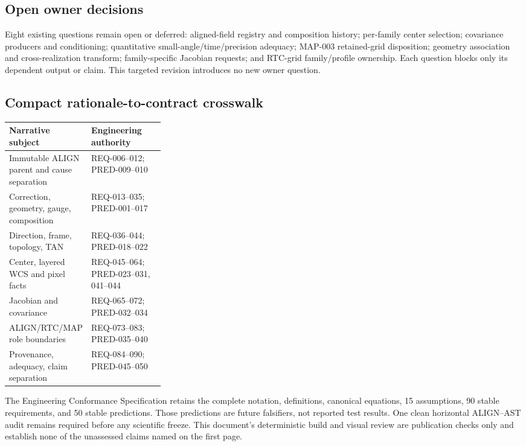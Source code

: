 \documentclass[10pt]{article}
\begin{document}
\subsection*{Open owner decisions}
Eight existing questions remain open or deferred: aligned-field registry and
composition history; per-family center selection; covariance producers and
conditioning; quantitative small-angle/time/precision adequacy; MAP-003
retained-grid disposition; geometry association and cross-realization
transform; family-specific Jacobian requests; and RTC-grid family/profile
ownership. Each question blocks only its dependent output or claim. This
targeted revision introduces no new owner question.

\subsection*{Compact rationale-to-contract crosswalk}
\begin{tabularx}{\linewidth}{>{\raggedright\arraybackslash}p{0.30\linewidth}X}
\toprule
Narrative subject & Engineering authority \\
\midrule
Immutable ALIGN parent and cause separation & REQ-006--012; PRED-009--010 \\
Correction, geometry, gauge, composition & REQ-013--035; PRED-001--017 \\
Direction, frame, topology, TAN & REQ-036--044; PRED-018--022 \\
Center, layered WCS and pixel facts & REQ-045--064; PRED-023--031, 041--044 \\
Jacobian and covariance & REQ-065--072; PRED-032--034 \\
ALIGN/RTC/MAP role boundaries & REQ-073--083; PRED-035--040 \\
Provenance, adequacy, claim separation & REQ-084--090; PRED-045--050 \\
\bottomrule
\end{tabularx}

The Engineering Conformance Specification retains the complete notation,
definitions, canonical equations, 15 assumptions, 90 stable requirements, and
50 stable predictions. Those predictions are future falsifiers, not reported
test results. One clean horizontal ALIGN--AST audit remains required before
any scientific freeze. This document's deterministic build and visual review
are publication checks only and establish none of the unassessed claims named
on the first page.
\end{document}
